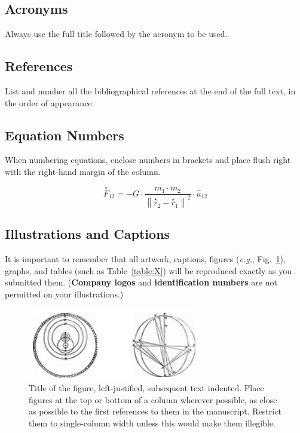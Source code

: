 \documentclass[fleqn]{iac}
\begin{document}
\subsection{Acronyms}
Always use the full title followed by the acronym to be used.

\subsection{References}
List and number all the bibliographical references at the end of the full text, in the order of appearance.\cite{IAFSecretariat2014}

\subsection{Equation Numbers}
When numbering equations, enclose numbers in brackets and place flush right with the right-hand margin of the column.

\begin{equation}
\stackrel{\star}{F}_{12} = -G \cdot \frac{ m_1 \cdot m_2 }{ \left\|\stackrel{\star}{r}_2 - \stackrel{\star}{r}_1\right\|^2 } \cdot \hat{u}_{12}
\end{equation}

\subsection{Illustrations and Captions}
It is important to remember that all artwork, captions, figures (\textit{e.g.}, Fig.~\ref{fig:X}), graphs, and tables (such as Table~\ref{table:X}) will be reproduced exactly as you submitted them. (\textbf{Company logos} and \textbf{identification numbers} are not permitted on your illustrations.)

\begin{figure}
\includegraphics[width=\columnwidth]{examplefigure.png}
\caption{\label{fig:X}Title of the figure, left-justified, subsequent text indented. Place figures at the top or bottom of a column wherever possible, as close as possible to the first references to them in the manuscript. Restrict them to single-column width unless this would make them illegible.} 
\end{figure}
\end{document}
